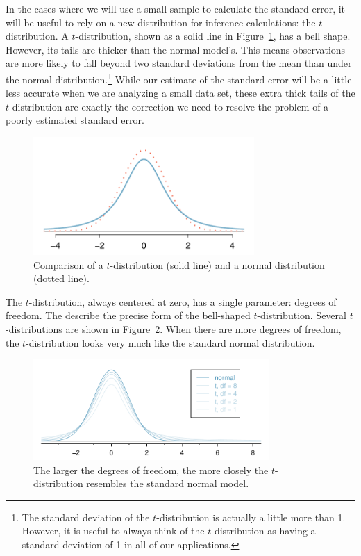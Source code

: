 In the cases where we will use a small sample to calculate the standard error, it will be useful to rely on a new distribution for inference calculations: the $t$-distribution. A $t$-distribution, shown as a solid line in Figure~\ref{tDistCompareToNormalDist}, has a bell shape. However, its tails are thicker than the normal model's. This means observations are more likely to fall beyond two standard deviations from the mean than under the normal distribution.\footnote{The standard deviation of the $t$-distribution is actually a little more than 1. However, it is useful to always think of the $t$-distribution as having a standard deviation of 1 in all of our applications.} While our estimate of the standard error will be a little less accurate when we are analyzing a small data set, these extra thick tails of the $t$-distribution are exactly the correction we need to resolve the problem of a poorly estimated standard error.

\begin{figure}
\centering
\includegraphics[height=45mm]{ch_inference_for_means/figures/tDistCompareToNormalDist/tDistCompareToNormalDist}
\caption{Comparison of a $t$-distribution (solid line) and a normal distribution (dotted line).}
\label{tDistCompareToNormalDist}
\end{figure}

The $t$-distribution, always centered at zero, has a single parameter: degrees of freedom. The  describe the precise form of the bell-shaped $t$-distribution. Several $t$-distributions are shown in Figure~\ref{tDistConvergeToNormalDist}. When there are more degrees of freedom, the $t$-distribution looks very much like the standard normal distribution.

\begin{figure}
\centering
\includegraphics[width=0.8\textwidth]{ch_inference_for_means/figures/tDistConvergeToNormalDist/tDistConvergeToNormalDist}
\caption{The larger the degrees of freedom, the more closely the $t$-distribution resembles the standard normal model.}
\label{tDistConvergeToNormalDist}
\end{figure}

